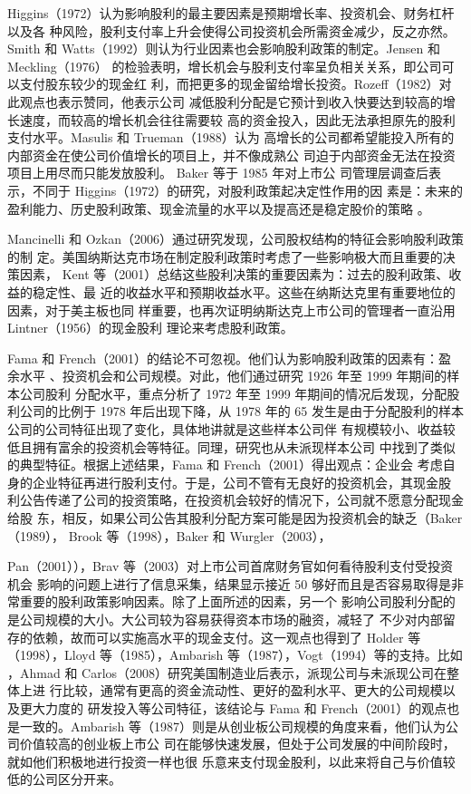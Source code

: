 \documentclass[../main]{subfiles}
\begin{document}
Higgins（1972）认为影响股利的最主要因素是预期增长率、投资机会、财务杠杆以及各
种风险，股利支付率上升会使得公司投资机会所需资金减少，反之亦然。Smith 和
Watts（1992）则认为行业因素也会影响股利政策的制定。Jensen 和 Meckling（1976）
的检验表明，增长机会与股利支付率呈负相关关系，即公司可以支付股东较少的现金红
利，而把更多的现金留给增长投资。Rozeff（1982）对此观点也表示赞同，他表示公司
减低股利分配是它预计到收入快要达到较高的增长速度，而较高的增长机会往往需要较
高的资金投入，因此无法承担原先的股利支付水平。Masulis 和 Trueman（1988）认为
高增长的公司都希望能投入所有的内部资金在使公司价值增长的项目上，并不像成熟公
司迫于内部资金无法在投资项目上用尽而只能发放股利。 Baker 等于 1985 年对上市公
司管理层调查后表示，不同于 Higgins（1972）的研究，对股利政策起决定性作用的因
素是：未来的盈利能力、历史股利政策、现金流量的水平以及提高还是稳定股价的策略
。

Mancinelli 和 Ozkan（2006）通过研究发现，公司股权结构的特征会影响股利政策的制
定。美国纳斯达克市场在制定股利政策时考虑了一些影响极大而且重要的决策因素，
Kent 等（2001）总结这些股利决策的重要因素为：过去的股利政策、收益的稳定性、最
近的收益水平和预期收益水平。这些在纳斯达克里有重要地位的因素，对于美主板也同
样重要，也再次证明纳斯达克上市公司的管理者一直沿用 Lintner（1956）的现金股利
理论来考虑股利政策。

Fama 和 French（2001）的结论不可忽视。他们认为影响股利政策的因素有：盈余水平
、投资机会和公司规模。对此，他们通过研究 1926 年至 1999 年期间的样本公司股利
分配水平，重点分析了 1972 年至 1999 年期间的情况后发现，分配股利公司的比例于
1978 年后出现下降，从 1978 年的 65%
发生是由于分配股利的样本公司的公司特征出现了变化，具体地讲就是这些样本公司伴
有规模较小、收益较低且拥有富余的投资机会等特征。同理，研究也从未派现样本公司
中找到了类似的典型特征。根据上述结果，Fama 和 French（2001）得出观点：企业会
考虑自身的企业特征再进行股利支付。于是，公司不管有无良好的投资机会，其现金股
利公告传递了公司的投资策略，在投资机会较好的情况下，公司就不愿意分配现金给股
东，相反，如果公司公告其股利分配方案可能是因为投资机会的缺乏（Baker（1989），
Brook 等（1998），Baker 和 Wurgler（2003），

Pan（2001）），Brav 等（2003）对上市公司首席财务官如何看待股利支付受投资机会
影响的问题上进行了信息采集，结果显示接近 50%
够好而且是否容易取得是非常重要的股利政策影响因素。除了上面所述的因素，另一个
影响公司股利分配的是公司规模的大小。大公司较为容易获得资本市场的融资，减轻了
不少对内部留存的依赖，故而可以实施高水平的现金支付。这一观点也得到了 Holder
等（1998），Lloyd 等（1985），Ambarish 等（1987），Vogt（1994）等的支持。比如
，Ahmad 和 Carlos（2008）研究美国制造业后表示，派现公司与未派现公司在整体上进
行比较，通常有更高的资金流动性、更好的盈利水平、更大的公司规模以及更大力度的
研发投入等公司特征，该结论与 Fama 和 French（2001）的观点也是一致的。Ambarish
等（1987）则是从创业板公司规模的角度来看，他们认为公司价值较高的创业板上市公
司在能够快速发展，但处于公司发展的中间阶段时，就如他们积极地进行投资一样也很
乐意来支付现金股利，以此来将自己与价值较低的公司区分开来。
\end{document}
